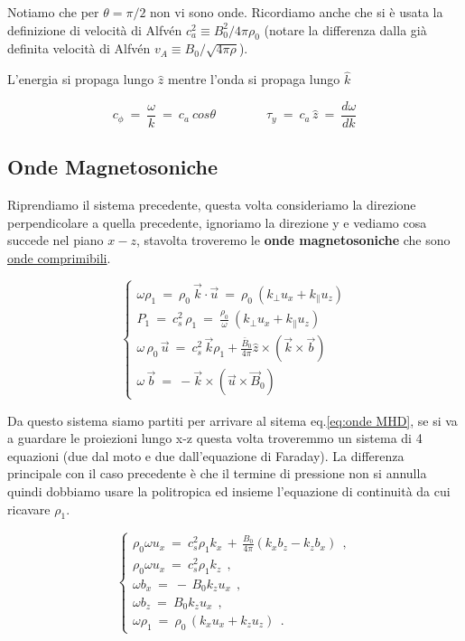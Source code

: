 Notiamo che per $\theta = \pi/2$ non vi sono onde. Ricordiamo anche che si è usata la definizione di velocità di Alfvén $\boxed{c_a^2 \equiv B^2_0 / 4\pi \rho_0}$ (notare la differenza dalla già definita velocità di Alfvén $v_A \equiv B_0 / \sqrt{4\pi \rho}$).

L'energia si propaga lungo $\hat z$ mentre l'onda si propaga lungo $\hat k$

\[ c_\phi\ =\ \frac{\omega}{k}\ =\ c_a\ cos\theta
\quad \quad \quad \quad \tau_y\ =\ c_a\, \hat z\ =\ \frac{d\omega}{dk}\]


%
%
\vspace{1cm}
\subsection{Onde Magnetosoniche}
Riprendiamo il sistema precedente, questa volta consideriamo la direzione perpendicolare a quella precedente, ignoriamo la direzione y e vediamo cosa succede nel piano $x-z$, stavolta troveremo le \textbf{onde magnetosoniche} che sono \underline{onde comprimibili}.

\[ \begin{cases}
	\omega \rho_1\ =\ \rho_0\ \vec k\cdot \vec u\ =\ \rho_0\ (k_\perp u_x + k_\parallel u_z)\\
	P_1\ =\ c^2_s\, \rho_1\ =\ \frac{\rho_0}{\omega}\ (k_\perp u_x + k_\parallel u_z)\\
	\omega\, \rho_0\, \vec u\ =\  c_s^2\, \vec k \rho_1 + \frac{\bar B_0}{4\pi}\hat z\times (\vec k\times \vec b)\\
	\omega\,\vec b\ =\ -\vec k\times (\vec u \times \vec B_0)
\end{cases} \]

Da questo sistema siamo partiti per arrivare al sitema eq.\ref{eq:onde MHD}, se si va a guardare le proiezioni lungo x-z questa volta troveremmo un sistema di 4 equazioni (due dal moto e due dall'equazione di Faraday). La differenza principale con il caso precedente è che il termine di pressione non si annulla quindi dobbiamo usare la politropica ed insieme l'equazione di continuità da cui ricavare $\rho_1$.

\[\begin{cases}
	\rho_0\omega u_x\ =\ c^2_s \rho_1 k_x\, +\, \frac{B_0}{4\pi} (k_x b_z - k_z b_x)\ \ ,\\
	\rho_0\omega u_x\ =\ c^2_s \rho_1 k_z\ \ ,\\
	\omega b_x\ =\ -\, B_0 k_z u_x\ \ ,\\
	\omega b_z\ =\ B_0 k_z u_x\ \ ,\\
	\omega \rho_1\ =\ \rho_0\, (k_x u_x + k_z u_z)\ \ .
\end{cases}\]

